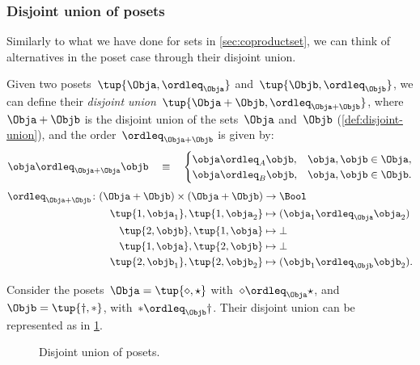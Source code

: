 \subsubsection{Disjoint union of posets}

Similarly to what we have done for sets in \cref{sec:coproductset}, we can think of alternatives in the poset case through their disjoint union.

\begin{definition}
Given two posets~$\tup{\Obja, \ordleq_\Obja} $ and~$\tup{\Objb, \ordleq_\Objb}$, we can define their \emph{disjoint union}~$\tup{\Obja + \Objb, \ordleq_{\Obja + \Objb}}$, where~$\Obja + \Objb$
is the disjoint union of the sets~$\Obja$ and~$\Objb$ (\cref{def:disjoint-union}), and the
order~$\ordleq_{\Obja + \Objb}$ is given by:
\begin{equation}
    \obja \ordleq_{\Obja + \Obja} \objb \quad\equiv\quad
    \begin{cases}
        \obja \ordleq_A \objb, & \obja,\objb \in \Obja, \\
        \obja \ordleq_B \objb, & \obja,\objb \in \Objb.
    \end{cases}
\end{equation}
\begin{equation}
\begin{aligned}
\ordleq_{\Obja+\Objb}\colon (\Obja+\Objb)\times (\Obja+\Objb)&\to \Bool\\
\tup{1,\obja_1},\tup{1,\obja_2}&\mapsto (\obja_1\ordleq_{\Obja} \obja_2)\\
\tup{2,\objb},\tup{1,\obja}&\mapsto \bot\\
\tup{1,\obja},\tup{2,\objb}&\mapsto \bot\\
\tup{2,\objb_1},\tup{2,\objb_2}&\mapsto (\objb_1\ordleq_\Objb \objb_2).
\end{aligned}
\end{equation}
\end{definition}


\begin{example}
Consider the posets~$\Obja=\tup{\diamond, \star}$ with~$\diamond \ordleq_\Obja \star$, and~$\Objb=\tup{\dagger,\ast}$, with~$\ast \ordleq_\Objb \dagger$. Their disjoint union can be represented as in \cref{fig:poset-coproduct}.

\begin{figure}[h!]
    \centering
    \caption{Disjoint union of posets. \label{fig:poset-coproduct}}
\end{figure}
\end{example}
